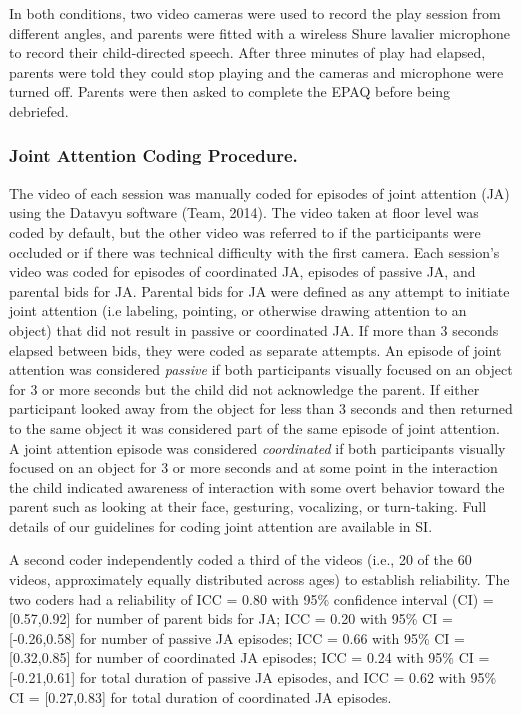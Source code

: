 \documentclass[man,floatsintext]{apa6}
\begin{document}
In both conditions, two video cameras were used to record the play session from different angles, and parents were fitted with a wireless Shure lavalier microphone to record their child-directed speech.
After three minutes of play had elapsed, parents were told they could stop playing and the cameras and microphone were turned off.
Parents were then asked to complete the EPAQ before being debriefed.

\hypertarget{joint-attention-coding-procedure.}{%
\subsubsection{Joint Attention Coding Procedure.}\label{joint-attention-coding-procedure.}}

The video of each session was manually coded for episodes of joint attention (JA) using the Datavyu software (Team, 2014).
The video taken at floor level was coded by default, but the other video was referred to if the participants were occluded or if there was technical difficulty with the first camera.
Each session's video was coded for episodes of coordinated JA, episodes of passive JA, and parental bids for JA.
Parental bids for JA were defined as any attempt to initiate joint attention (i.e labeling, pointing, or otherwise drawing attention to an object) that did not result in passive or coordinated JA.
If more than 3 seconds elapsed between bids, they were coded as separate attempts.
An episode of joint attention was considered \emph{passive} if both participants visually focused on an object for 3 or more seconds but the child did not acknowledge the parent.
If either participant looked away from the object for less than 3 seconds and then returned to the same object it was considered part of the same episode of joint attention.
A joint attention episode was considered \emph{coordinated} if both participants visually focused on an object for 3 or more seconds and at some point in the interaction the child indicated awareness of interaction with some overt behavior toward the parent such as looking at their face, gesturing, vocalizing, or turn-taking.
Full details of our guidelines for coding joint attention are available in SI.

A second coder independently coded a third of the videos (i.e., 20 of the 60 videos, approximately equally distributed across ages) to establish reliability.
The two coders had a reliability of ICC = 0.80 with 95\% confidence interval (CI) = {[}0.57,0.92{]} for number of parent bids for JA; ICC = 0.20 with 95\% CI = {[}-0.26,0.58{]} for number of passive JA episodes; ICC = 0.66 with 95\% CI = {[}0.32,0.85{]} for number of coordinated JA episodes; ICC = 0.24 with 95\% CI = {[}-0.21,0.61{]} for total duration of passive JA episodes, and ICC = 0.62 with 95\% CI = {[}0.27,0.83{]} for total duration of coordinated JA episodes.
\end{document}
